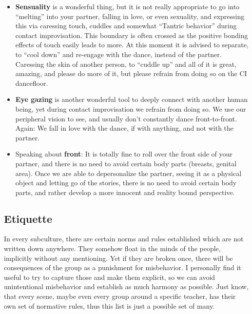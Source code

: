 \begin{itemize}
    \item \textbf{Sensuality} is a wonderful thing, but it is not really appropriate to go into ``melting'' into your partner, falling in love, or even sexuality, and expressing this via caressing touch, cuddles and somewhat ``Tantric behavior'' during contact improvisation.
    This boundary is often crossed as the positive bonding effects of touch easily leads to more.
    At this moment it is advised to separate, to ``cool down'' and re-engage with the dance, instead of the partner.
    Caressing the skin of another person, to ``cuddle up'' and all of it is great, amazing, and please do more of it, but please refrain from doing so on the CI dancefloor.
    \item \textbf{Eye gazing} is another wonderful tool to deeply connect with another human being, yet during contact improvisation we refrain from doing so.
    We use our peripheral vision to see, and usually don't constantly dance front-to-front.
    Again: We fall in love with the dance, if with anything, and not with the partner.
    \item Speaking about \textbf{front}: It is totally fine to roll over the front side of your partner, and there is no need to avoid certain body parts (breasts, genital area).
    Once we are able to depersonalize the partner, seeing it as a physical object and letting go of the stories, there is no need to avoid certain body parts, and rather develop a more innocent and reality bound perspective.
\end{itemize}

\subsection{Etiquette}\label{subsec:etiquette}

In every subculture, there are certain norms and rules established which are not written down anywhere.
They somehow float in the minds of the people, implicitly without any mentioning.
Yet if they are broken once, there will be consequences of the group as a punishment for misbehavior.
I personally find it useful to try to capture those and make them explicit, so we can avoid unintentional misbehavior and establish as much harmony as possible.
Just know, that every scene, maybe even every group around a specific teacher, has their own set of normative rules, thus this list is just a possible set of many.

